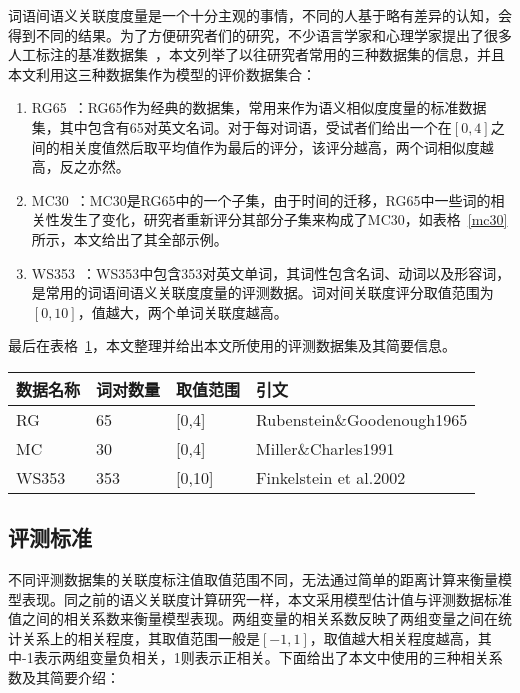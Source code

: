 词语间语义关联度度量是一个十分主观的事情，不同的人基于略有差异的认知，会得到不同的结果。为了方便研究者们的研究，不少语言学家和心理学家提出了很多人工标注的基准数据集~\cite{MC30/Miller02, RG65/RubensteinG65, wordsim353/FinkelsteinGMRSWR02, ws/AgirreAHKPS09, YP130/Yang06verbsimilarity, MEN/BruniTB14}，本文列举了以往研究者常用的三种数据集的信息，并且本文利用这三种数据集作为模型的评价数据集合：
\begin{enumerate}
    \item RG65~\cite{RG65/RubensteinG65}：RG65作为经典的数据集，常用来作为语义相似度度量的标准数据集，其中包含有65对英文名词。对于每对词语，受试者们给出一个在$[0,4]$之间的相关度值然后取平均值作为最后的评分，该评分越高，两个词相似度越高，反之亦然。
    \item MC30~\cite{MC30/Miller02}：MC30是RG65中的一个子集，由于时间的迁移，RG65中一些词的相关性发生了变化，研究者重新评分其部分子集来构成了MC30，如表格~\ref{mc30}所示，本文给出了其全部示例。
    \item WS353~\cite{wordsim353/FinkelsteinGMRSWR02}：WS353中包含353对英文单词，其词性包含名词、动词以及形容词，是常用的词语间语义关联度度量的评测数据。词对间关联度评分取值范围为$[0,10]$，值越大，两个单词关联度越高。
\end{enumerate}
最后在表格~\ref{golden}，本文整理并给出本文所使用的评测数据集及其简要信息。

\begin{table}[htbp]
    \center
    \vspace{5pt}
    \begin{tabular}{|p{1.8cm}|p{1.8cm}|p{1.8cm}|p{5cm}|}
    \hline
    数据名称    & 词对数量    & 取值范围      & 引文 \\ \hline
    RG        & 65         & [0,4]       & Rubenstein\&Goodenough1965       \\ \hline
    MC        & 30         & [0,4]       & Miller\&Charles1991          \\ \hline 
    WS353     & 353        & [0,10]      & Finkelstein et al.2002         \\ \hline
    \end{tabular}
    \label{golden}
\end{table}

\subsection{评测标准}
不同评测数据集的关联度标注值取值范围不同，无法通过简单的距离计算来衡量模型表现。同之前的语义关联度计算研究一样，本文采用模型估计值与评测数据标准值之间的相关系数来衡量模型表现。两组变量的相关系数反映了两组变量之间在统计关系上的相关程度，其取值范围一般是$[-1, 1]$，取值越大相关程度越高，其中-1表示两组变量负相关，1则表示正相关。下面给出了本文中使用的三种相关系数及其简要介绍：

